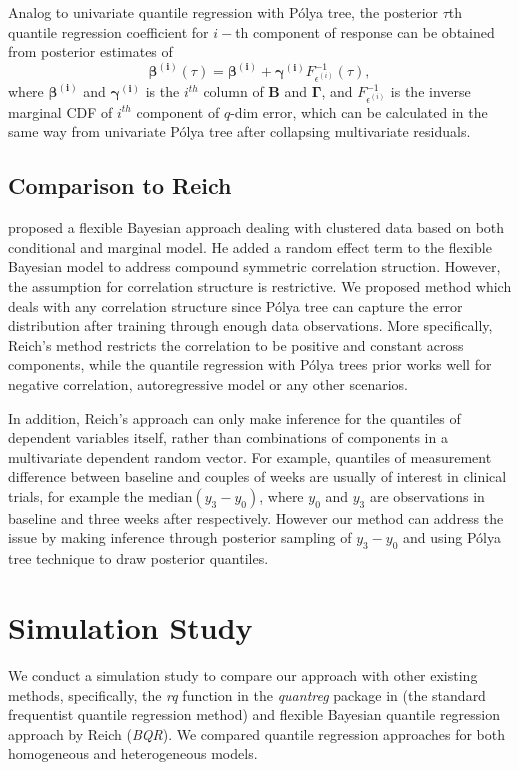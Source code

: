 \documentclass[12pt]{article}
\newcommand{\polya}{P\'{o}lya}
\begin{document}
Analog to univariate quantile regression with \polya{} tree, the
posterior $\tau$th quantile regression coefficient for $i-$th
component of response can be obtained from posterior estimates of
\begin{equation}\label{eq:mul}
  \bm{\beta^{(i)}}(\tau) = \bm{\beta^{(i)}} + \bm{\gamma^{(i)}}F^{-1}_{\epsilon^{(i)}}(\tau),
\end{equation}
where $\bm{\beta^{(i)}}$ and $\bm{\gamma^{(i)}}$ is the $i^{th}$
column of $\bm{B}$ and $\bm{\Gamma}$, and $F^{-1}_{\epsilon^{(i)}}$ is
the inverse marginal CDF of $i^{th}$ component of $q$-dim error, which
can be calculated in the same way from univariate \polya{} tree after
collapsing multivariate residuals.

\subsection{Comparison to Reich}
\citet{reich2010} proposed a flexible Bayesian approach dealing with
clustered data based on both conditional and marginal model. He added
a random effect term to the flexible Bayesian model to address
compound symmetric correlation struction. However, the assumption for
correlation structure is restrictive. We proposed method which deals
with any correlation structure since \polya{} tree can capture the
error distribution after training through enough data
observations. More specifically, Reich's method restricts the
correlation to be positive and constant across components, while the
quantile regression with \polya{} trees prior works well for negative
correlation, autoregressive model or any other scenarios.

In addition, Reich's approach can only make inference for the
quantiles of dependent variables itself, rather than combinations of
components in a multivariate dependent random vector. For example,
quantiles of measurement difference between baseline and couples of
weeks are usually of interest in clinical trials, for example the
$\text{median}(y_3-y_0)$, where $y_0$ and $y_3$ are observations in
baseline and three weeks after respectively. However our method can
address the issue by making inference through posterior sampling of
$y_3-y_0$ and using \polya{} tree technique to draw posterior
quantiles.

\section{Simulation Study}
\label{sec:simulations}
We conduct a simulation study to compare our approach with other
existing methods, specifically, the \textit{rq} function in the
\textit{quantreg} package \citep{quantreg} in \cite{R} (the standard
frequentist quantile regression method) and flexible Bayesian quantile
regression approach by Reich (\textit{BQR}).  We compared quantile
regression approaches for both homogeneous and heterogeneous models.
\end{document}

